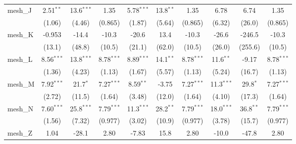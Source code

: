 \begin{tabular}{lccccccccc}
   mesh\_J                                                     & 2.51$^{**}$   & 13.6$^{***}$  & 1.35          & 5.78$^{***}$  & 13.8$^{**}$    & 1.35          & 6.78          & 6.74           & 1.35\\   
                                                               & (1.06)        & (4.46)        & (0.865)       & (1.87)        & (5.64)         & (0.865)       & (6.32)        & (26.0)         & (0.865)\\   
   mesh\_K                                                     & -0.953        & -14.4         & -10.3         & -20.6         & 13.4           & -10.3         & -26.6         & -246.5         & -10.3\\   
                                                               & (13.1)        & (48.8)        & (10.5)        & (21.1)        & (62.0)         & (10.5)        & (26.0)        & (255.6)        & (10.5)\\   
   mesh\_L                                                     & 8.56$^{***}$  & 13.8$^{***}$  & 8.78$^{***}$  & 8.89$^{***}$  & 14.1$^{**}$    & 8.78$^{***}$  & 11.6$^{**}$   & -9.17          & 8.78$^{***}$\\   
                                                               & (1.36)        & (4.23)        & (1.13)        & (1.67)        & (5.57)         & (1.13)        & (5.24)        & (16.7)         & (1.13)\\   
   mesh\_M                                                     & 7.92$^{***}$  & 21.7$^{*}$    & 7.27$^{***}$  & 8.59$^{**}$   & -3.75          & 7.27$^{***}$  & 11.3$^{***}$  & 29.8$^{*}$     & 7.27$^{***}$\\   
                                                               & (2.72)        & (11.5)        & (1.64)        & (3.48)        & (12.0)         & (1.64)        & (4.10)        & (17.3)         & (1.64)\\   
   mesh\_N                                                     & 7.60$^{***}$  & 25.8$^{***}$  & 7.79$^{***}$  & 11.3$^{***}$  & 28.2$^{**}$    & 7.79$^{***}$  & 18.0$^{***}$  & 36.8$^{**}$    & 7.79$^{***}$\\   
                                                               & (1.56)        & (7.32)        & (0.977)       & (3.02)        & (10.9)         & (0.977)       & (3.78)        & (15.7)         & (0.977)\\   
   mesh\_Z                                                     & 1.04          & -28.1         & 2.80          & -7.83         & 15.8           & 2.80          & -10.0         & -47.8          & 2.80\\   

\end{tabular}

